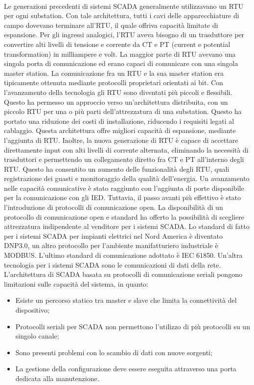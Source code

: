 \paragraph{} Le generazioni precedenti di sistemi SCADA generalmente utilizzavano un RTU per ogni substation. Con tale architettura, tutti i cavi delle apparecchiature di campo dovevano terminare all'RTU, il quale offriva capacità limitate di espansione. Per gli ingressi analogici, l'RTU aveva bisogno di un trasduttore per convertire alti livelli di tensione e corrente da CT e PT (current e potential transformation) in milliampere e volt. La maggior parte di RTU avevano una singola porta di comunicazione ed erano capaci di comunicare con una singola master station. La comunicazione fra un RTU e la sua master station era tipicamente ottenuta mediante protocolli proprietari orientati ai bit. Con l'avanzamento della tecnologia gli RTU sono diventati più piccoli e flessibili. Questo ha permesso un approccio verso un'architettura distribuita, con un piccolo RTU per una o più parti dell'attrezzatura di una substation. Questo ha portato una riduzione dei costi di installazione, riducendo i requisiti legati al cablaggio. Questa architettura offre migliori capacità di espansione, mediante l'aggiunta di RTU. Inoltre, la nuova generazione di RTU è capace di accettare direttamente input con alti livelli di corrente alternata, eliminando la necessità di trasduttori e permettendo un collegamento diretto fra CT e PT all'interno degli RTU. Questo ha consentito un aumento delle funzionalità degli RTU, quali registrazione dei guasti e monitoraggio della qualità dell'energia.
\newline
Un avanzamento nelle capacità comunicative è stato raggiunto con l'aggiunta di porte disponibile per la comunicazione con gli IED. Tuttavia, il passo avanti più effettivo è stato l'introduzione di protocolli di comunicazione open. La disponibilità di un protocollo di comunicazione open e standard ha offerto la possibilità di scegliere attrezzatura indipendente al venditore per i sistemi SCADA. Lo standard di fatto per i sistemi SCADA per impianti elettrici nel Nord America è diventato DNP3.0, un altro protocollo per l'ambiente manifatturiero industriale è MODBUS. L'ultimo standard di comunicazione adottato è IEC 61850. 
\newline
Un'altra tecnologia per i sistemi SCADA sono le comunicazioni di dati della rete. L'architettura di SCADA basata su protocolli di comunicazione seriali pongono  limitazioni sulle capacità del sistema, in quanto:
\begin{itemize}
	\item Esiste un percorso statico tra master e slave che limita la connettività del dispositivo;
	\item Protocolli seriali per SCADA non permettono l'utilizzo di più protocolli su un singolo canale;
	\item Sono presenti problemi con lo scambio di dati con nuove sorgenti;
	\item La gestione della configurazione deve essere eseguita attraverso una porta dedicata alla manutenzione.
\end{itemize}   


